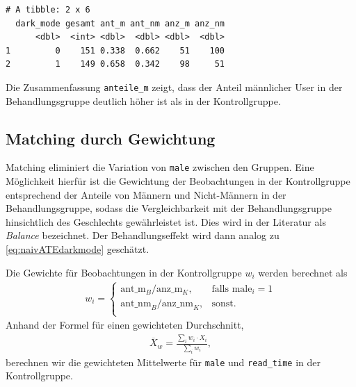 \documentclass[
  a4paper,
  DIV=11,
  oneside]{scrreprt}
\begin{document}
\begin{verbatim}
# A tibble: 2 x 6
  dark_mode gesamt ant_m ant_nm anz_m anz_nm
      <dbl>  <int> <dbl>  <dbl> <dbl>  <dbl>
1         0    151 0.338  0.662    51    100
2         1    149 0.658  0.342    98     51
\end{verbatim}

Die Zusammenfassung \texttt{anteile\_m} zeigt, dass der Anteil
männlicher User in der Behandlungsgruppe deutlich höher ist als in der
Kontrollgruppe.

\subsection{Matching durch Gewichtung}\label{matching-durch-gewichtung}

Matching eliminiert die Variation von \texttt{male} zwischen den
Gruppen. Eine Möglichkeit hierfür ist die Gewichtung der Beobachtungen
in der Kontrollgruppe entsprechend der Anteile von Männern und
Nicht-Männern in der Behandlungsgruppe, sodass die Vergleichbarkeit mit
der Behandlungsgruppe hinsichtlich des Geschlechts gewährleistet ist.
Dies wird in der Literatur als \emph{Balance} bezeichnet. Der
Behandlungseffekt wird dann analog zu \eqref{eq:naivATEdarkmode}
geschätzt.

Die Gewichte für Beobachtungen in der Kontrollgruppe \(w_i\) werden
berechnet als \begin{align}
  w_i = 
  \begin{cases}
    \text{ant\_m}_B/\text{anz\_m}_{K}, & \text{falls } \text{male}_i = 1\\
        \text{ant\_nm}_B/\text{anz\_nm}_{K}, & \text{sonst.}\\
  \end{cases}\label{eq:darkmodeweights}
\end{align} Anhand der Formel für einen gewichteten Durchschnitt,
\begin{align}
  \overline{X}_w = \frac{\sum_i w_i \cdot X_i}{\sum_i w_i},
\end{align} berechnen wir die gewichteten Mittelwerte für \texttt{male}
und \texttt{read\_time} in der Kontrollgruppe.
\end{document}
